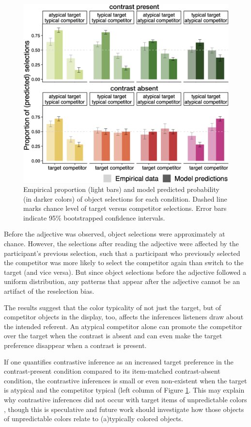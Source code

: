 \documentclass[10pt,letterpaper]{article}
\newcommand{\figref}[1]{Figure \ref{#1}}
\begin{document}
\begin{figure}
	\begin{center}
		\includegraphics[width=.475\textwidth]{graphs/model-bycond-paper.pdf}
	\end{center}
\caption{Empirical proportion  (light bars) and model predicted probability (in darker colors) of object selections for each condition. Dashed line marks chance level of target versus competitor selections. Error bars indicate 95\% bootstrapped confidence intervals.} %
\label{modelcompr-results}
\end{figure}


Before the adjective was observed, object selections were approximately at chance. However, the selections after reading the adjective were affected by the participant's previous selection, such that a participant who previously selected the competitor was more likely to select the competitor again than switch to the target (and vice versa). But since object selections before the adjective followed a uniform distribution, any patterns that appear after the adjective cannot be an artifact of the reselection bias.

The results suggest that the color typicality of not just the target, but of competitor objects in the display, too, affects the inferences listeners draw about the intended referent. An atypical competitor alone can promote the competitor over the target when the contrast is absent and can even make the target preference disappear when a contrast is present. %

If one quantifies contrastive inference as an increased target preference in the contrast-present condition compared to its item-matched contrast-absent condition, the contrastive inferences is small or even non-existent when the target is atypical and the competitor typical (left column of \figref{modelcompr-results}. This may explain why contrastive inferences did not occur with target items of unpredictable colors \cite{Sedivy:2003}, though this is speculative and future work should investigate how those objects of unpredictable colors relate to (a)typically colored objects.
\end{document}
